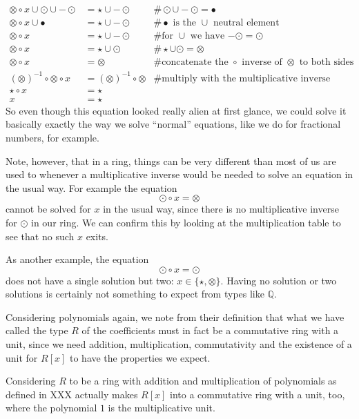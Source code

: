 \begin{example}
\begin{align*}
\otimes \circ x \cup \odot \cup -\odot  &= \star \cup -\odot & \# \odot \cup -\odot = \bullet\\
\otimes \circ x \cup \bullet &= \star \cup -\odot & \text{\# $\bullet$ is the $\cup$ neutral element}\\
\otimes \circ x &= \star \cup -\odot & \text{\# for $\cup$ we have $-\odot = \odot$} \\
\otimes \circ x &= \star \cup \odot &\# \star \cup \odot = \otimes \\
\otimes \circ x &= \otimes  &\text{\# concatenate the $\circ$ inverse of $\otimes$ to both sides}\\
(\otimes)^{-1}\circ \otimes \circ x &= (\otimes)^{-1}\circ \otimes & \text{\# multiply with the multiplicative inverse}\\
\star \circ x &= \star\\
x &= \star
\end{align*}
So even though this equation looked really alien at first glance, we could solve it basically exactly the way we solve ``normal'' equations, like we do for fractional numbers, for example.

Note, however, that in a ring, things can be very different than most of us are used to whenever a multiplicative inverse would be needed to solve an equation in the usual way. For example the equation
$$
\odot \circ x = \otimes
$$
cannot be solved for $x$ in the usual way, since there is no multiplicative inverse for $\odot$ in our ring. We can confirm this by looking at the multiplication table to see that no such $x$ exits. 

As another example, the equation
$$
\odot \circ x = \odot
$$
does not have a single solution but two: $x\in\{\star, \otimes\}$. Having no solution or two solutions is certainly not something to expect from types like $\mathbb{Q}$.
\end{example}
\begin{example} Considering polynomials again, we note from their definition that what we have called the type $R$ of the coefficients must in fact be a commutative ring with a unit, since we need addition, multiplication, commutativity and the existence of a unit for $R[x]$ to have the properties we expect.

Considering $R$ to be a ring with addition and multiplication of polynomials as defined in XXX actually makes $R[x]$ into a commutative ring with a unit, too, where the polynomial $1$ is the multiplicative unit.
\end{example}
